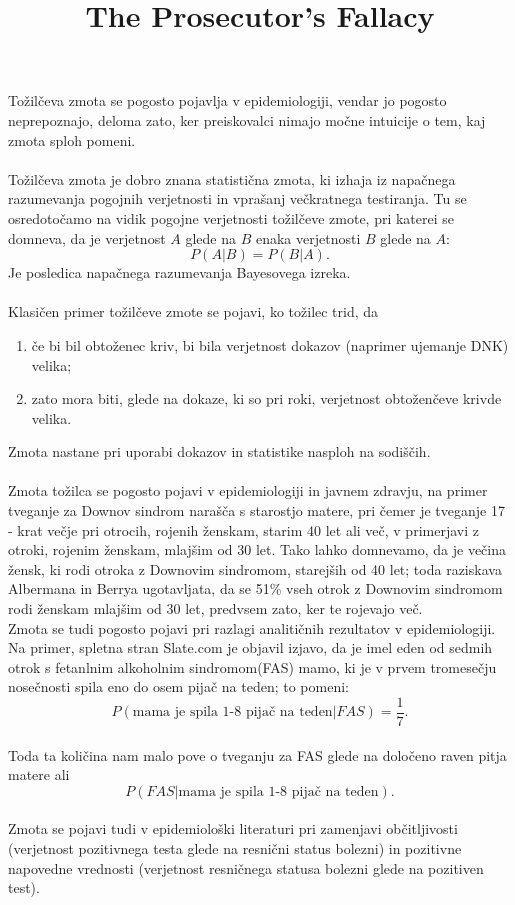 \documentclass[a4paper,12pt]{article}
\begin{document}
\title{The Prosecutor's Fallacy}
\maketitle

Tožilčeva zmota se pogosto pojavlja v epidemiologiji, vendar jo pogosto neprepoznajo, deloma zato, ker preiskovalci nimajo močne intuicije 
o tem, kaj zmota sploh pomeni. \\
\\
Tožilčeva zmota je dobro znana statistična zmota, ki izhaja iz napačnega razumevanja pogojnih verjetnosti in vprašanj večkratnega testiranja. 
Tu se osredotočamo na vidik pogojne verjetnosti tožilčeve zmote, pri katerei se domneva, da je verjetnost $A$ glede na $B$ enaka verjetnosti 
$B$ glede na $A$:
$$ P(A \lvert B) = P(B \lvert A). $$
Je posledica napačnega razumevanja Bayesovega izreka. \\
\\
Klasičen primer tožilčeve zmote se pojavi, ko tožilec trid, da
\begin{enumerate}
    \item če bi bil obtoženec kriv, bi bila verjetnost dokazov (naprimer ujemanje DNK) velika;
    \item zato mora biti, glede na dokaze, ki so pri roki, verjetnost obtoženčeve krivde velika.
\end{enumerate}
Zmota nastane pri uporabi dokazov in statistike nasploh na sodiščih.
\\
\\
Zmota tožilca se pogosto pojavi v epidemiologiji in javnem zdravju, na primer tveganje za Downov sindrom narašča s starostjo matere, pri čemer je 
tveganje 17 - krat večje pri otrocih, rojenih ženskam, starim 40 let ali več, v primerjavi z otroki, rojenim ženskam, mlajšim od 30 let. Tako lahko 
domnevamo, da je večina žensk, ki rodi otroka z Downovim sindromom, starejših od 40 let; toda raziskava Albermana in Berrya ugotavljata, da se 51\% vseh 
otrok z Downovim sindromom rodi ženskam mlajšim od 30 let, predvsem zato, ker te rojevajo več. \\
Zmota se tudi pogosto pojavi pri razlagi analitičnih rezultatov v epidemiologiji. Na primer, spletna stran Slate.com je objavil izjavo, da je imel eden od 
sedmih otrok s fetanlnim alkoholnim sindromom(FAS) mamo, ki je v prvem tromesečju nosečnosti spila eno do osem pijač na teden; to pomeni: \\
\[ P(\text{mama je spila 1-8 pijač na teden} \lvert FAS) = \frac{1}{7}.\] \\
Toda ta količina nam malo pove o tveganju za FAS glede na določeno raven pitja matere ali \\
\[P(FAS \lvert \text{mama je spila 1-8 pijač na teden}).\]
\\
Zmota se pojavi tudi v epidemiološki literaturi pri zamenjavi občitljivosti (verjetnost pozitivnega testa glede na resnični status bolezni) in pozitivne 
napovedne vrednosti (verjetnost resničnega statusa bolezni glede na pozitiven test).
\end{document}
